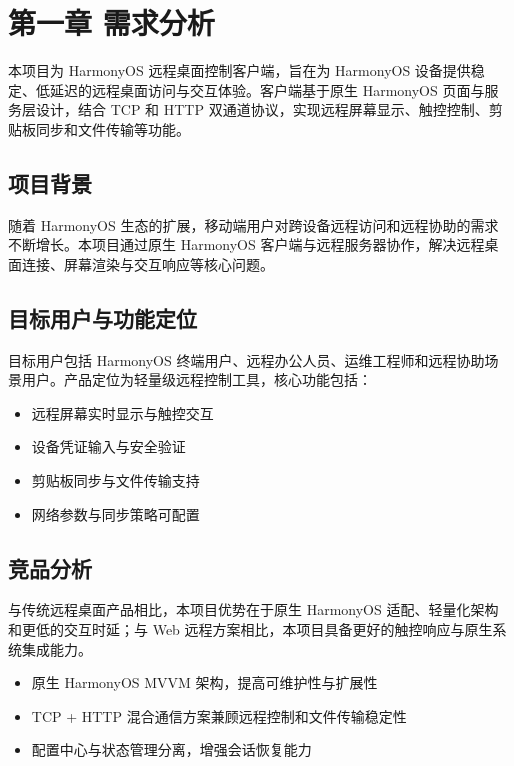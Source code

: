 \documentclass[12pt,a4paper]{article}
\begin{document}


\tableofcontents
\newpage

\section{第一章 需求分析}

本项目为 HarmonyOS 远程桌面控制客户端，旨在为 HarmonyOS 设备提供稳定、低延迟的远程桌面访问与交互体验。客户端基于原生 HarmonyOS 页面与服务层设计，结合 TCP 和 HTTP 双通道协议，实现远程屏幕显示、触控控制、剪贴板同步和文件传输等功能。

\subsection{项目背景}

随着 HarmonyOS 生态的扩展，移动端用户对跨设备远程访问和远程协助的需求不断增长。本项目通过原生 HarmonyOS 客户端与远程服务器协作，解决远程桌面连接、屏幕渲染与交互响应等核心问题。

\subsection{目标用户与功能定位}

目标用户包括 HarmonyOS 终端用户、远程办公人员、运维工程师和远程协助场景用户。产品定位为轻量级远程控制工具，核心功能包括：
\begin{itemize}
    \item 远程屏幕实时显示与触控交互
    \item 设备凭证输入与安全验证
    \item 剪贴板同步与文件传输支持
    \item 网络参数与同步策略可配置
\end{itemize}

\subsection{竞品分析}

与传统远程桌面产品相比，本项目优势在于原生 HarmonyOS 适配、轻量化架构和更低的交互时延；与 Web 远程方案相比，本项目具备更好的触控响应与原生系统集成能力。
\begin{itemize}
    \item 原生 HarmonyOS MVVM 架构，提高可维护性与扩展性
    \item TCP + HTTP 混合通信方案兼顾远程控制和文件传输稳定性
    \item 配置中心与状态管理分离，增强会话恢复能力
\end{itemize}
\end{document}
